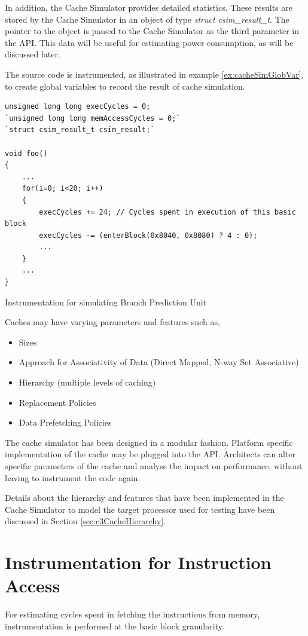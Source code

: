 In addition, the Cache Simulator provides detailed statistics. These results are stored by the Cache Simulator in an object of type \emph{struct csim\_result\_t}. The pointer to the object is passed to the Cache Simulator as the third parameter in the API. This data will be useful for estimating power consumption, as will be discussed later. 

The source code is instrumented, as illustrated in example \ref{ex:cacheSimGlobVar}, to create global variables to record the result of cache simulation.

\vspace*{10pt}
\begin{Example}[h]
\begin{lstlisting}
unsigned long long execCycles = 0;
`unsigned long long memAccessCycles = 0;`
`struct csim_result_t csim_result;`

void foo()
{
    ...
    for(i=0; i<20; i++)
    {
        execCycles += 24; // Cycles spent in execution of this basic block
        execCycles -= (enterBlock(0x8040, 0x8080) ? 4 : 0);
        ...
    }
    ...
}
\end{lstlisting}
\caption{Instrumentation for simulating Branch Prediction Unit}
\label{ex:cacheSimGlobVar}
\end{Example}

Caches may have varying parameters and features such as,
\begin{itemize} \itemsep -2pt
\item Sizes
\item Approach for Associativity of Data (Direct Mapped, N-way Set Associative)
\item Hierarchy (multiple levels of caching)
\item Replacement Policies
\item Data Prefetching Policies
\end{itemize}

The cache simulator has been designed in a modular fashion. Platform specific implementation of the cache may be plugged into the API. Architects can alter specific parameters of the cache and analyse the impact on performance, without having to instrument the code again.

Details about the hierarchy and features that have been implemented in the Cache Simulator to model the target processor used for testing have been discussed in Section \ref{sec:c3CacheHierarchy}.

\section{Instrumentation for Instruction Access}
For estimating cycles spent in fetching the instructions from memory, instrumentation is performed at the basic block granularity. 

